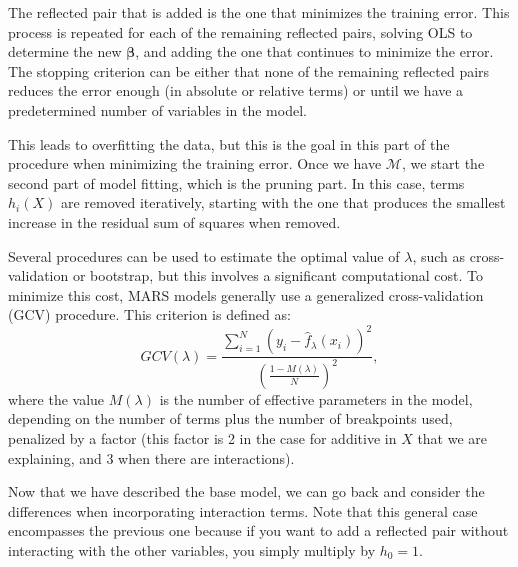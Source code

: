 The reflected pair that is added is the one that minimizes the training error. This process is repeated for each of the remaining reflected pairs, solving OLS to determine the new $\boldsymbol\beta$, and adding the one that continues to minimize the error. The stopping criterion can be either that none of the remaining reflected pairs reduces the error enough (in absolute or relative terms) or until we have a predetermined number of variables in the model.

This leads to overfitting the data, but this is the goal in this part of the procedure when minimizing the training error. Once we have $\mathcal{M}$, we start the second part of model fitting, which is the pruning part. In this case, terms $h_i(X)$ are removed iteratively, starting with the one that produces the smallest increase in the residual sum of squares when removed. 

Several procedures can be used to estimate the optimal value of $\lambda$, such as cross-validation or bootstrap, but this involves a significant computational cost. To minimize this cost, MARS models generally use a generalized cross-validation (GCV) procedure. This criterion is defined as:
$$
GCV(\lambda) = \frac{ \sum_{i=1}^N (y_i - \hat f_\lambda(x_i))^2 }{\left( \frac{1 - M(\lambda)}{N} \right)^2},
$$
where the value $M(\lambda)$ is the number of effective parameters in the model, depending on the number of terms plus the number of breakpoints used, penalized by a factor (this factor is 2 in the case for additive in $X$ that we are explaining, and 3 when there are interactions).

Now that we have described the base model, we can go back and consider the differences when incorporating interaction terms.  Note that this general case encompasses the previous one because if you want to add a reflected pair without interacting with the other variables, you simply multiply by $h_0 = 1$.

